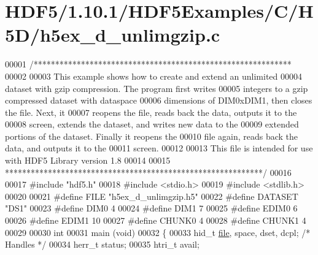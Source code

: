 \hypertarget{_h_d_f5_21_810_81_2_h_d_f5_examples_2_c_2_h5_d_2h5ex__d__unlimgzip_8c_source}{}\section{H\+D\+F5/1.10.1/\+H\+D\+F5\+Examples/\+C/\+H5\+D/h5ex\+\_\+d\+\_\+unlimgzip.c}
\label{_h_d_f5_21_810_81_2_h_d_f5_examples_2_c_2_h5_d_2h5ex__d__unlimgzip_8c_source}

\begin{DoxyCode}
00001 \textcolor{comment}{/************************************************************}
00002 \textcolor{comment}{}
00003 \textcolor{comment}{  This example shows how to create and extend an unlimited}
00004 \textcolor{comment}{  dataset with gzip compression.  The program first writes}
00005 \textcolor{comment}{  integers to a gzip compressed dataset with dataspace}
00006 \textcolor{comment}{  dimensions of DIM0xDIM1, then closes the file.  Next, it}
00007 \textcolor{comment}{  reopens the file, reads back the data, outputs it to the}
00008 \textcolor{comment}{  screen, extends the dataset, and writes new data to the}
00009 \textcolor{comment}{  extended portions of the dataset.  Finally it reopens the}
00010 \textcolor{comment}{  file again, reads back the data, and outputs it to the}
00011 \textcolor{comment}{  screen.}
00012 \textcolor{comment}{}
00013 \textcolor{comment}{  This file is intended for use with HDF5 Library version 1.8}
00014 \textcolor{comment}{}
00015 \textcolor{comment}{ ************************************************************/}
00016 
00017 \textcolor{preprocessor}{#include "hdf5.h"}
00018 \textcolor{preprocessor}{#include <stdio.h>}
00019 \textcolor{preprocessor}{#include <stdlib.h>}
00020 
00021 \textcolor{preprocessor}{#define FILE            "h5ex\_d\_unlimgzip.h5"}
00022 \textcolor{preprocessor}{#define DATASET         "DS1"}
00023 \textcolor{preprocessor}{#define DIM0            4}
00024 \textcolor{preprocessor}{#define DIM1            7}
00025 \textcolor{preprocessor}{#define EDIM0           6}
00026 \textcolor{preprocessor}{#define EDIM1           10}
00027 \textcolor{preprocessor}{#define CHUNK0          4}
00028 \textcolor{preprocessor}{#define CHUNK1          4}
00029 
00030 \textcolor{keywordtype}{int}
00031 main (\textcolor{keywordtype}{void})
00032 \{
00033     hid\_t           \hyperlink{structfile}{file}, space, dset, dcpl;    \textcolor{comment}{/* Handles */}
00034     herr\_t          status;
00035     htri\_t          avail;

\end{DoxyCode}
